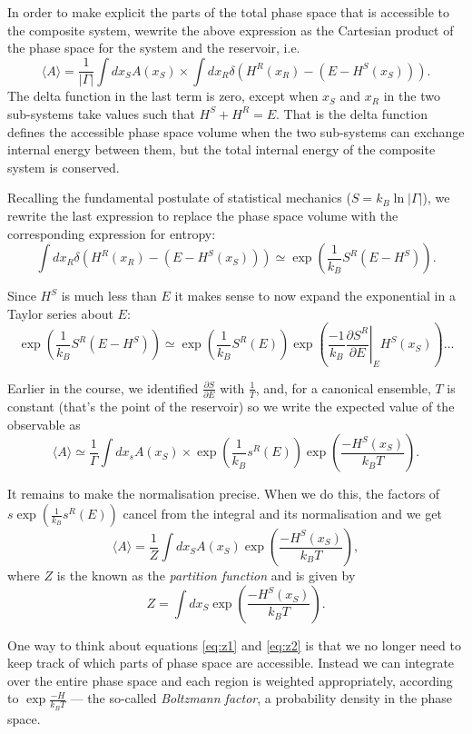 \documentclass{article}
\begin{document}
In order to make explicit the parts of the total phase space that is accessible to the composite system, wewrite the above expression as the Cartesian product of the phase space for the system and the reservoir, i.e.
$$
	\langle A\rangle =\frac{1}{|\Gamma|}\int dx_SA(x_S)\times\int dx_R\delta(H^R(x_R)-(E-H^S(x_S))).
$$
The delta function in the last term is zero, except when $x_S$ and $x_R$ in the two sub-systems take values such that $H^S+H^R=E$. That is the delta function defines the accessible phase space volume when the two sub-systems can exchange internal energy between them, but the total internal energy of the composite system is conserved.

Recalling the fundamental postulate of statistical mechanics ($S=k_B\ln|\Gamma|$), we rewrite the last expression to replace the phase space volume with the corresponding expression for entropy:
$$
	\int dx_R\delta(H^R(x_R)-(E-H^S(x_S))) \simeq \exp\left(\frac{1}{k_B}S^R(E-H^S)\right).
$$

Since $H^S$ is much less than $E$ it makes sense to now expand the exponential in a Taylor series about $E$:
$$
	\exp\left(\frac{1}{k_B}S^R(E-H^S)\right)\simeq \exp\left(\frac{1}{k_B}S^R(E)\right)\exp\left(\frac{-1}{k_B}\left.\frac{\partial S^R}{\partial E}\right|_E H^S(x_S)\right)\ldots
$$

Earlier in the course, we identified $\frac{\partial S}{\partial E}$ with $\frac{1}{T}$, and, for a canonical ensemble, $T$ is constant (that's the point of the reservoir) so we write the expected value of the observable as
$$
	\langle A\rangle \simeq \frac{1}{\Gamma}\int dx_sA(x_S)\times\exp\left(\frac{1}{k_B}s^R(E)\right)\exp\left(\frac{-H^S(x_S)}{k_BT}\right).
$$

It remains to make the normalisation precise. When we do this, the factors of $s\exp\left(\frac{1}{k_B}s^R(E)\right)$ cancel from the integral and its normalisation and we get
\begin{equation}
	\langle A\rangle = \frac{1}{Z}\int dx_SA(x_S)\exp\left(\frac{-H^S(x_S)}{k_BT}\right),
	\label{eq:z1}
\end{equation}
where $Z$ is the known as the \emph{partition function} and is given by
\begin{equation}
	Z = \int dx_S\exp\left(\frac{-H^S(x_S)}{k_BT}\right).
	\label{eq:z2}
\end{equation}

One way to think about equations \ref{eq:z1} and \ref{eq:z2} is that we no longer need to keep track of which parts of phase space are accessible. Instead we can integrate over the entire phase space and each region is weighted appropriately, according to $\exp\frac{-H}{k_BT}$ --- the so-called \emph{Boltzmann factor}, a probability density in the phase space.
\end{document}
